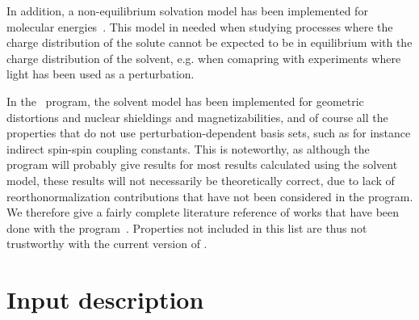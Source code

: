 In addition, a non-equilibrium
solvation model has been implemented
for molecular energies~\cite{kvmachahjajjcp103}. This model in needed
when studying processes where the charge distribution of the solute
cannot be expected to be in equilibrium with the charge distribution
of the solvent, e.g. when comapring with experiments where light has
been used as a perturbation.

In the \aba\ program, the solvent model has been implemented for
geometric distortions and nuclear shieldings and
magnetizabilities,
and of course all the
properties that do not use perturbation-dependent basis
sets, such as for
instance indirect spin-spin coupling 
constants. This is noteworthy, as
although the program will probably give results for most results
calculated using the solvent  model, these results will not
necessarily be theoretically correct, due to lack of reorthonormalization
contributions that have not been considered in the program. We
therefore give a fairly complete literature reference of works that
have been done with the
program~\cite{kvmpjkrthjcp106,poakvmkrthjpc100}. Properties not
included in this list are thus not trustworthy with the current
version of {\dalton}.

\section{Input description}\label{sec:solventinp}

